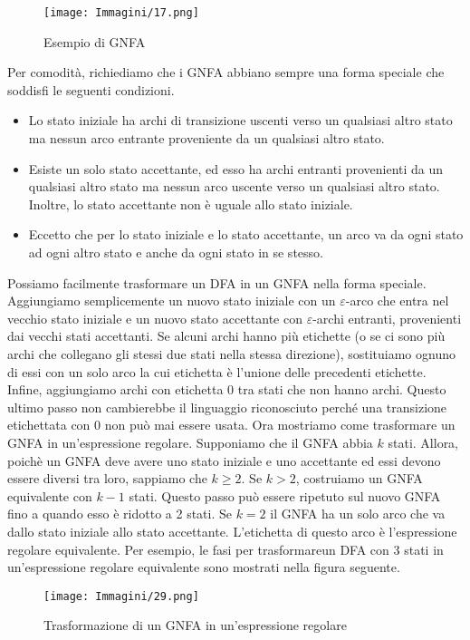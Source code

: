\documentclass{article}
\begin{document}
\begin{figure}[H]
    \centering
    \texttt{[image: Immagini/17.png]}
    \caption{Esempio di GNFA}
    \label{fig:your_image}
\end{figure}
Per comodità, richiediamo che i GNFA abbiano sempre una forma speciale
che soddisfi le seguenti condizioni.
\begin{itemize}
    \item Lo stato iniziale ha archi di transizione uscenti verso un qualsiasi altro stato ma nessun arco entrante proveniente da un qualsiasi altro stato.
    \item Esiste un solo stato accettante, ed esso ha archi entranti provenienti da un qualsiasi altro stato ma nessun arco uscente verso un qualsiasi altro stato. Inoltre, lo stato accettante non è uguale allo stato iniziale.
    \item Eccetto che per lo stato iniziale e lo stato accettante, un arco va da ogni stato ad ogni altro stato e anche da ogni stato in se stesso.
\end{itemize}

Possiamo facilmente trasformare un DFA in un GNFA nella forma speciale.
Aggiungiamo semplicemente un nuovo stato iniziale con un $\varepsilon$-arco che entra nel vecchio stato iniziale e un nuovo stato accettante con $\varepsilon$-archi entranti, provenienti dai vecchi stati accettanti. Se alcuni archi hanno più etichette (o se ci sono più archi che collegano gli stessi due stati nella stessa direzione), sostituiamo ognuno di essi con un solo arco la cui etichetta è l'unione delle precedenti etichette. Infine, aggiungiamo archi con etichetta $0$ tra stati che non hanno archi. Questo ultimo passo non cambierebbe il linguaggio riconosciuto perché una transizione etichettata con $0$ non può mai essere usata.
Ora mostriamo come trasformare un GNFA in un'espressione regolare.
Supponiamo che il GNFA abbia $k$ stati. Allora, poichè un GNFA deve avere uno stato iniziale e uno accettante ed essi devono essere diversi tra loro, sappiamo che $k \geq 2$. Se $k > 2$, costruiamo un GNFA equivalente con $k-1$ stati. Questo passo può essere ripetuto sul nuovo GNFA fino a quando esso è ridotto a 2 stati. Se $k = 2$ il GNFA ha un solo arco che va dallo stato iniziale allo stato accettante. L'etichetta di questo arco è l'espressione regolare equivalente.
Per esempio, le fasi per trasformareun DFA con 3 stati in un'espressione regolare equivalente sono mostrati nella figura seguente.

\begin{figure}[H]
    \centering
    \texttt{[image: Immagini/29.png]}
    \caption{Trasformazione di un GNFA in un'espressione regolare}
    \label{fig:your_image}
\end{figure}
\end{document}
